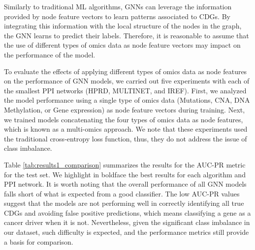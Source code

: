 Similarly to traditional ML algorithms, GNNs can leverage the information provided by node feature vectors to learn patterns associated to CDGs.  By integrating this information with the local structure of the nodes in the graph, the GNN learns to predict their labels. Therefore, it is reasonable to assume that the use of different types of omics data as node feature vectors may impact on the performance of the model.

To evaluate the effects of applying different types of omics data as node features on the performance of GNN models, we carried out five experiments with each of the smallest PPI networks (\ie HPRD, MULTINET, and IREF). First, we analyzed the model performance using a single type of omics data (\eg Mutations, CNA, DNA Methylation, or Gene expression) as node feature vectors during training. Next, we trained models concatenating the four types of omics data as node features, which is known as a multi-omics approach. We note that these experiments used the traditional cross-entropy loss function, thus, they do not address the issue of class imbalance.

Table \ref{tab:results1_comparison} summarizes the results for the AUC-PR metric for the test set. We highlight in boldface the best results for each algorithm and PPI network. It is worth noting that the overall performance of all GNN models falls short of what is expected from a good classifier. The low AUC-PR values suggest that the models are not performing well in correctly identifying all true CDGs and avoiding false positive predictions, which means classifying a gene as a cancer driver when it is not. Nevertheless, given the significant class imbalance in our dataset, such difficulty is expected, and the performance metrics still provide a basis for comparison.
 

